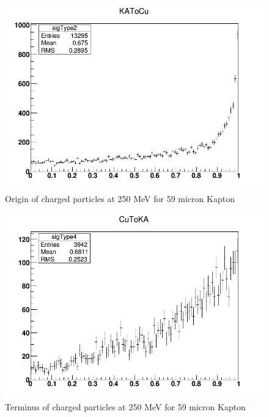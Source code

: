 \documentclass{article}
\begin{document}
\begin{figure}[H]
\centering
\includegraphics[width=6in]{figures/Cu_KA_vac/S59/KAtoCu.png}
\caption{Origin of charged particles at 250 MeV for 59 micron Kapton}
\label{fig:G4_stats_vac_b}
\end{figure}

\begin{figure}[H]
\centering
\includegraphics[width=6in]{figures/Cu_KA_vac/S59/CutoKA.png}
\caption{Terminus of charged particles at 250 MeV for 59 micron Kapton}
\label{fig:G4_stats_vac_c}
\end{figure}
\end{document}
